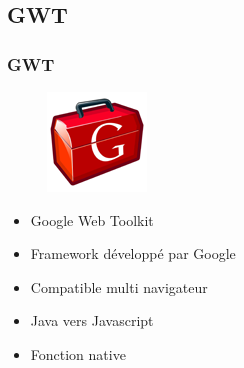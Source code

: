   \subsection*{GWT}
    \begin{frame}
      \frametitle{GWT}
      \begin{figure}
		\center
		\includegraphics[scale=0.60]{gwt-logo}
	  \end{figure}
      \begin{itemize}
        \item Google Web Toolkit
        \item Framework développé par Google
        \item<2->Compatible multi navigateur
        \item<3-> Java vers Javascript
        \item<4->Fonction native 
      \end{itemize}
    \end{frame}

